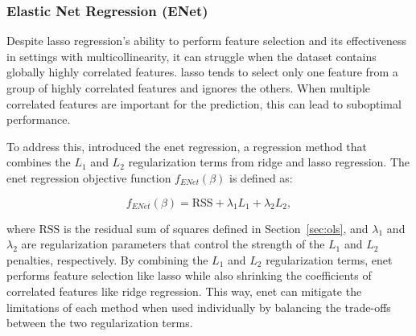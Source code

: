 \subsubsection{Elastic Net Regression (ENet)}
Despite \gls{lasso} regression's ability to perform feature selection and its effectiveness in settings with multicollinearity, it can struggle when the dataset contains globally highly correlated features.
\gls{lasso} tends to select only one feature from a group of highly correlated features and ignores the others.
When multiple correlated features are important for the prediction, this can lead to suboptimal performance.

To address this, \citet{zou_regularization_2005} introduced the \gls{enet} regression, a regression method that combines the $L_1$ and $L_2$ regularization terms from ridge and \gls{lasso} regression.
The \gls{enet} regression objective function $f_{ENet}(\beta)$ is defined as:

$$
f_{ENet}(\beta) = \text{RSS} + \lambda_1 L_1 + \lambda_2 L_2,
$$

where $\text{RSS}$ is the residual sum of squares defined in Section~\ref{sec:ols}, and $\lambda_1$ and $\lambda_2$ are regularization parameters that control the strength of the $L_1$ and $L_2$ penalties, respectively.
By combining the $L_1$ and $L_2$ regularization terms, \gls{enet} performs feature selection like \gls{lasso} while also shrinking the coefficients of correlated features like ridge regression.
This way, \gls{enet} can mitigate the limitations of each method when used individually by balancing the trade-offs between the two regularization terms.